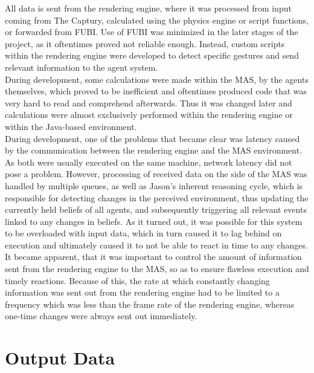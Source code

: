 \documentclass[draft,final]{vutinfth} %
\begin{document}
All data is sent from the rendering engine, where it was processed from input coming from The Captury, calculated using the physics engine or script functions, or forwarded from FUBI. 
Use of FUBI was minimized in the later stages of the project, as it oftentimes proved not reliable enough. 
Instead, custom scripts within the rendering engine were developed to detect specific gestures and send relevant information to the agent system. \\
During development, some calculations were made within the MAS, by the agents themselves, which proved to be inefficient and oftentimes produced code that was very hard to read and comprehend afterwards. 
Thus it was changed later and calculations were almost exclusively performed within the rendering engine or within the Java-based environment.  \\
During development, one of the problems that became clear was latency caused by the communication between the rendering engine and the MAS environment. 
As both were usually executed on the same machine, network latency did not pose a problem. 
However, processing of received data on the side of the MAS was handled by multiple queues, as well as Jason’s inherent reasoning cycle, which is responsible for detecting changes in the perceived environment, thus updating the currently held beliefs of all agents, and subsequently triggering all relevant events linked to any changes in beliefs. 
As it turned out, it was possible for this system to be overloaded with input data, which in turn caused it to lag behind on execution and ultimately caused it to not be able to react in time to any changes. 
It became apparent, that it was important to control the amount of information sent from the rendering engine to the MAS, so as to ensure flawless execution and timely reactions. 
Because of this, the rate at which constantly changing information was sent out from the rendering engine had to be limited to a frequency which was less than the frame rate of the rendering engine, whereas one-time changes were always sent out immediately.

\section{Output Data}
\label{chap:outputdata}
\end{document}
